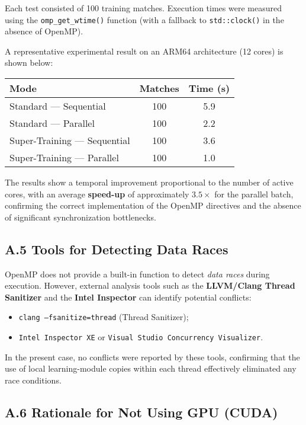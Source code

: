 \documentclass[12pt,a4paper]{article}
\begin{document}
Each test consisted of 100 training matches.  
Execution times were measured using the \texttt{omp\_get\_wtime()} function (with a fallback to \texttt{std::clock()} in the absence of OpenMP).  

A representative experimental result on an ARM64 architecture (12 cores) is shown below:

\begin{center}
\begin{tabular}{|l|c|c|}
\hline
\textbf{Mode} & \textbf{Matches} & \textbf{Time (s)} \\
\hline
Standard — Sequential & 100 & 5.9 \\
Standard — Parallel & 100 & 2.2 \\
Super-Training — Sequential & 100 & 3.6 \\
Super-Training — Parallel & 100 & 1.0 \\
\hline
\end{tabular}
\end{center}

The results show a temporal improvement proportional to the number of active cores, with an average \textbf{speed-up} of approximately $3.5\times$ for the parallel batch, confirming the correct implementation of the OpenMP directives and the absence of significant synchronization bottlenecks.

\subsection*{A.5 Tools for Detecting Data Races}

OpenMP does not provide a built-in function to detect \textit{data races} during execution.  
However, external analysis tools such as the \textbf{LLVM/Clang Thread Sanitizer} and the \textbf{Intel Inspector} can identify potential conflicts:
\begin{itemize}
  \item \texttt{clang --fsanitize=thread} (Thread Sanitizer);
  \item \texttt{Intel Inspector XE} or \texttt{Visual Studio Concurrency Visualizer}.
\end{itemize}
In the present case, no conflicts were reported by these tools, confirming that the use of local learning-module copies within each thread effectively eliminated any race conditions.

\subsection*{A.6 Rationale for Not Using GPU (CUDA)}
\end{document}

